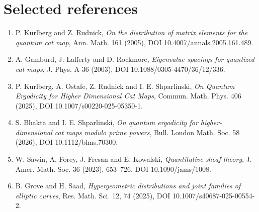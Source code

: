 \documentclass[11pt]{article}
\newcommand{\1}{\mathbf 1}
\begin{document}
\section*{Selected references}
\begin{enumerate}
\item P. Kurlberg and Z. Rudnick, \emph{On the distribution of matrix elements for the quantum cat map}, Ann. Math. 161 (2005), DOI 10.4007/annals.2005.161.489.
\item A. Gamburd, J. Lafferty and D. Rockmore, \emph{Eigenvalue spacings for quantized cat maps}, J. Phys. A 36 (2003), DOI 10.1088/0305-4470/36/12/336.
\item P. Kurlberg, A. Ostafe, Z. Rudnick and I. E. Shparlinski, \emph{On Quantum Ergodicity for Higher Dimensional Cat Maps}, Commun. Math. Phys. 406 (2025), DOI 10.1007/s00220-025-05350-1.
\item S. Bhakta and I. E. Shparlinski, \emph{On quantum ergodicity for higher-dimensional cat maps modulo prime powers}, Bull. London Math. Soc. 58 (2026), DOI 10.1112/blms.70300.
\item W. Sawin, A. Forey, J. Fresan and E. Kowalski, \emph{Quantitative sheaf theory}, J. Amer. Math. Soc. 36 (2023), 653--726, DOI 10.1090/jams/1008.
\item B. Grove and H. Saad, \emph{Hypergeometric distributions and joint families of elliptic curves}, Res. Math. Sci. 12, 74 (2025), DOI 10.1007/s40687-025-00554-2.
\end{enumerate}
\end{document}
